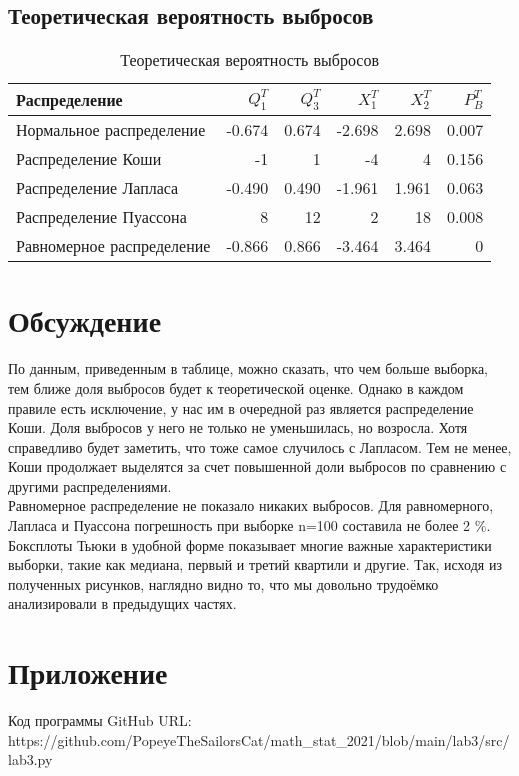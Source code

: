 \documentclass[a4paper]{article}
\begin{document}
\subsection{Теоретическая вероятность выбросов}
	\begin{table}[H]
		\centering
		\begin{tabular}[t]{lrrrrr}
			\hline
			Распределение   &      $Q_1^T$	& $Q_3^T$ & $X_1^T$ & $X_2^T$ & $P_B^T$	\\
			\hline
			Нормальное распределение 	& -0.674& 0.674 & -2.698 	&  2.698 	& 0.007 \\
			Распределение Коши 			& -1	& 1		&  -4		& 4			& 0.156 \\
			Распределение Лапласа 		&-0.490	& 0.490	& -1.961	& 1.961		& 0.063\\
			Распределение Пуассона 		& 8		& 12	& 2			& 18		& 0.008 \\
			Равномерное распределение 	&-0.866 & 0.866	& -3.464 	& 3.464 	& 0	\\
			
			\hline
		\end{tabular}
		\caption{Теоретическая вероятность выбросов}
		\label{tab:normal}
	\end{table}
	
\section{Обсуждение}
 По данным, приведенным в таблице, можно сказать, что чем больше выборка, тем ближе доля выбросов будет к теоретической оценке. Однако в каждом правиле есть исключение, у нас им в очередной раз является распределение Коши. Доля выбросов у него не только не уменьшилась, но возросла. Хотя справедливо будет заметить, что тоже самое случилось с Лапласом. Тем не менее, Коши продолжает выделятся за счет повышенной доли выбросов по сравнению с другими распределениями.\\
 Равномерное распределение не показало никаких выбросов. Для равномерного, Лапласа и Пуассона погрешность при выборке n=100 составила не более 2 \%.\\
 



 Боксплоты Тьюки в удобной форме показывает многие важные характеристики выборки, такие как медиана, первый и третий квартили и другие. Так, исходя
из полученных рисунков, наглядно видно то, что мы довольно трудоёмко
анализировали в предыдущих частях.


\section{Приложение}

\noindent Код программы GitHub URL:\\ https://github.com/PopeyeTheSailorsCat/math\_stat\_2021/blob/main/lab3/src/lab3.py
\end{document}
